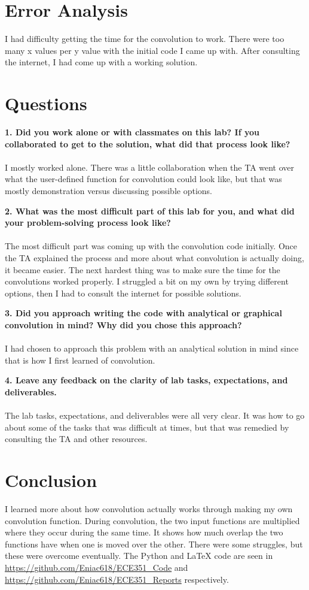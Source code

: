 \documentclass[12pt]{report}
\begin{document}
\pagebreak
\section{Error Analysis}
I had difficulty getting the time for the convolution to work. There were too many x values per y value with the initial code I came up with. After consulting the internet, I had come up with a working solution.
\section{Questions}
\textbf{1. Did you work alone or with classmates on this lab? If you collaborated to get to the solution,
what did that process look like?} \\ \\
I mostly worked alone. There was a little collaboration when the TA went over what the user-defined function for convolution could look like, but that was mostly demonstration versus discussing possible options.

\textbf{2. What was the most difficult part of this lab for you, and what did your problem-solving
process look like?} \\ \\
The most difficult part was coming up with the convolution code initially. Once the TA explained the process and more about what convolution is actually doing, it became easier. The next hardest thing was to make sure the time for the convolutions worked properly. I struggled a bit on my own by trying different options, then I had to consult the internet for possible solutions.

\textbf{3. Did you approach writing the code with analytical or graphical convolution in mind? Why
did you chose this approach?} \\ \\
I had chosen to approach this problem with an analytical solution in mind since that is how I first learned of convolution.

\textbf{4. Leave any feedback on the clarity of lab tasks, expectations, and deliverables.} \\ \\
The lab tasks, expectations, and deliverables were all very clear. It was how to go about some of the tasks that was difficult at times, but that was remedied by consulting the TA and other resources.

\section{Conclusion}
I learned more about how convolution actually works through making my own convolution function. During convolution, the two input functions are multiplied where they occur during the same time. It shows how much overlap the two functions have when one is moved over the other. There were some struggles, but these were overcome eventually. The Python and \LaTeX{} code are seen in \url{https://github.com/Eniac618/ECE351_Code} and \url{https://github.com/Eniac618/ECE351_Reports} respectively.
\end{document}
